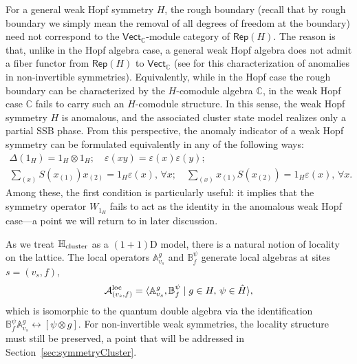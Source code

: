 \documentclass[a4paper,11pt]{article}
\theoremstyle{theorem}
\theoremstyle{remark}
\newcommand{\Av}{\mathbb{A}}
\newcommand{\Bf}{\mathbb{B}}
\newcommand{\Cbb}{\mathbb{C}}
\newcommand{\Rep}{\mathsf{Rep}}
\newcommand{\Vect}{\mathsf{Vect}}
\begin{document}
For a general weak Hopf symmetry $H$, the rough boundary (recall that by rough boundary we simply mean the removal of all degrees of freedom at the boundary) need not correspond to the $\Vect_{\Cbb}$-module category of $\Rep(H)$. The reason is that, unlike in the Hopf algebra case, a general weak Hopf algebra does not admit a fiber functor from $\Rep(H)$ to $\Vect_{\Cbb}$ (see \cite{thorngren2019fusion} for this characterization of anomalies in non-invertible symmetries). Equivalently, while in the Hopf case the rough boundary can be characterized by the $H$-comodule algebra $\Cbb$, in the weak Hopf case $\Cbb$ fails to carry such an $H$-comodule structure. In this sense, the weak Hopf symmetry $H$ is anomalous, and the associated cluster state model realizes only a partial SSB phase.
From this perspective, the anomaly indicator of a weak Hopf symmetry can be formulated equivalently in any of the following ways:
\begin{equation}
\begin{aligned}
    \Delta(1_H) = 1_H \otimes 1_H;
\quad \varepsilon(xy) = \varepsilon(x)\varepsilon(y);\\
\sum_{(x)}S(x_{(1)})x_{(2)} = 1_H\varepsilon(x),\, \forall x;
\quad \sum_{(x)} x_{(1)}S(x_{(2)}) = 1_H\varepsilon(x), \,\forall x.
\end{aligned}
\end{equation}
Among these, the first condition is particularly useful: it implies that the symmetry operator $W_{1_H}$ fails to act as the identity in the anomalous weak Hopf case—a point we will return to in later discussion.



As we treat $\mathbb{H}_{\rm cluster}$ as a $(1+1)$D model, there is a natural notion of locality on the lattice.  
The local operators $\Av^g_{v_s}$ and $\Bf_f^{\psi}$ generate local algebras at sites $s=(v_s,f)$,  
\begin{equation}
    \mathcal{A}_{(v_s,f)}^{\rm loc} = \langle \Av^g_{v_s}, \Bf_f^{\psi} \mid g \in H, \, \psi \in \hat{H} \rangle,
\end{equation}
which is isomorphic to the quantum double algebra via the identification $\Bf_f^{\psi}\Av_{v_s}^g \leftrightarrow [\psi\otimes g]$.  
For non-invertible weak symmetries, the locality structure must still be preserved, a point that will be addressed in Section~\ref{sec:symmetryCluster}.
\end{document}
